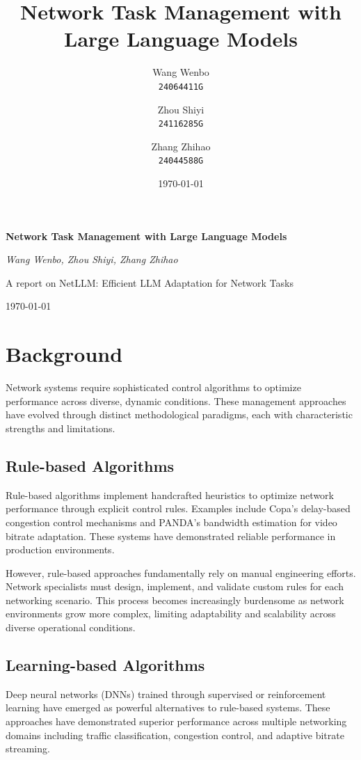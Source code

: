 \documentclass[twocolumn]{article}
\title{\LARGE \textbf{Network Task Management with Large Language Models}}
\author{Wang Wenbo \\ \texttt{24064411G} \and Zhou Shiyi \\ \texttt{24116285G} \and Zhang Zhihao \\ \texttt{24044588G}}
\date{\today}
\begin{document}

\begin{titlepage}
    \centering
    \vspace*{2cm}
    {\Huge\bfseries Network Task Management with Large Language Models\par}
    \vspace{2cm}
    {\Large\itshape Wang Wenbo, Zhou Shiyi, Zhang Zhihao\par}
    \vfill
    {\large A report on NetLLM: Efficient LLM Adaptation for Network Tasks\par}
    \vspace{1cm}
    {\large \today\par}
\end{titlepage}

\maketitle
\tableofcontents
\newpage

\section{Background}
Network systems require sophisticated control algorithms to optimize performance across diverse, dynamic conditions. These management approaches have evolved through distinct methodological paradigms, each with characteristic strengths and limitations.

\subsection{Rule-based Algorithms}
Rule-based algorithms implement handcrafted heuristics to optimize network performance through explicit control rules. Examples include Copa's delay-based congestion control mechanisms and PANDA's bandwidth estimation for video bitrate adaptation. These systems have demonstrated reliable performance in production environments.

However, rule-based approaches fundamentally rely on manual engineering efforts. Network specialists must design, implement, and validate custom rules for each networking scenario. This process becomes increasingly burdensome as network environments grow more complex, limiting adaptability and scalability across diverse operational conditions.

\subsection{Learning-based Algorithms}
Deep neural networks (DNNs) trained through supervised or reinforcement learning have emerged as powerful alternatives to rule-based systems. These approaches have demonstrated superior performance across multiple networking domains including traffic classification, congestion control, and adaptive bitrate streaming.
\end{document}
